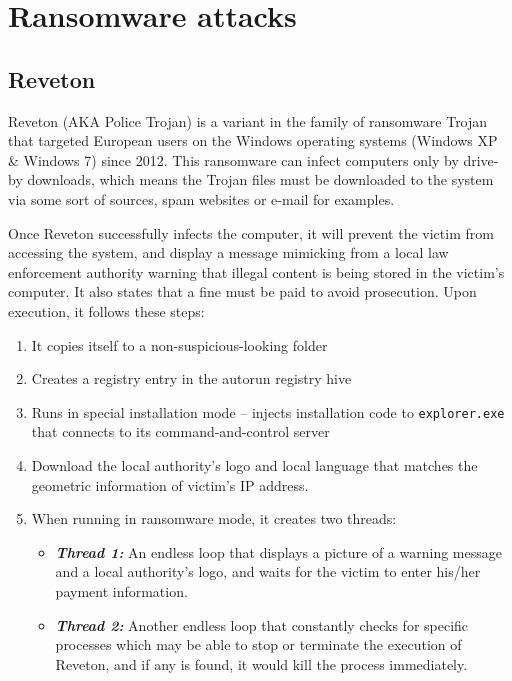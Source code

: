 \documentclass[10pt,a4paper]{article}
\begin{document}
\section{Ransomware attacks}

\subsection{Reveton}
Reveton (AKA Police Trojan) is a variant in the family of ransomware Trojan that targeted European users on the Windows operating systems (Windows XP \& Windows 7) since 2012. This ransomware can infect computers only by drive-by downloads, which means the Trojan files must be downloaded to the system via some sort of sources, spam websites or e-mail for examples.

Once Reveton successfully infects the computer, it will prevent the victim from accessing the system, and display a message mimicking from a local law enforcement authority warning that illegal content is being stored in the victim’s computer. It also states that a fine must be paid to avoid prosecution.
Upon execution, it follows these steps:

\begin{enumerate}
\item It copies itself to a non-suspicious-looking folder
\item Creates a registry entry in the autorun registry hive
\item Runs in special installation mode – injects installation code to \texttt{explorer.exe} that connects to its command-and-control server
\item Download the local authority’s logo and local language that matches the geometric information of victim’s IP address.
\item When running in ransomware mode, it creates two threads:
\begin{itemize}
\item \textbf{\textit{Thread 1: }}An endless loop that displays a picture of a warning message and a local authority’s logo, and waits for the victim to enter his/her payment information.
\item \textbf{\textit{Thread 2: }}Another endless loop that constantly checks for specific processes which may be able to stop or terminate the execution of Reveton, and if any is found, it would kill the process immediately.
\end{itemize}
\end{enumerate}
\end{document}
